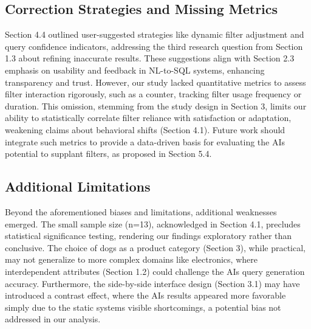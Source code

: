 \documentclass[../../submission.tex]{subfiles}
\begin{document}
\subsection{Correction Strategies and Missing Metrics}
Section 4.4 outlined user-suggested strategies like dynamic filter adjustment and query confidence 
indicators, addressing the third research question from Section 1.3 about refining inaccurate results. 
These suggestions align with Section 2.3 emphasis on usability and feedback in NL-to-SQL systems, 
enhancing transparency and trust. However, our study lacked quantitative metrics to assess filter 
interaction rigorously, such as a counter, tracking filter usage frequency or duration. This omission, stemming from the study design in Section 3, limits our ability to 
statistically correlate filter reliance with satisfaction or adaptation, weakening claims about 
behavioral shifts (Section 4.1). Future work should integrate such metrics to provide a data-driven basis 
for evaluating the AIs potential to supplant filters, as proposed in Section 5.4.

\subsection{Additional Limitations}
Beyond the aforementioned biases and limitations, additional weaknesses emerged. 
The small sample size (n=13), acknowledged in Section 4.1, precludes statistical 
significance testing, rendering our findings exploratory rather than conclusive. 
The choice of dogs as a product category (Section 3), while practical, may not generalize to 
more complex domains like electronics, where interdependent attributes (Section 1.2) could challenge the AIs 
query generation accuracy. Furthermore, the side-by-side interface design (Section 3.1) may have introduced a contrast effect, where the AIs results appeared more favorable simply due to the static systems visible shortcomings, 
a potential bias not addressed in our analysis.
\end{document}
